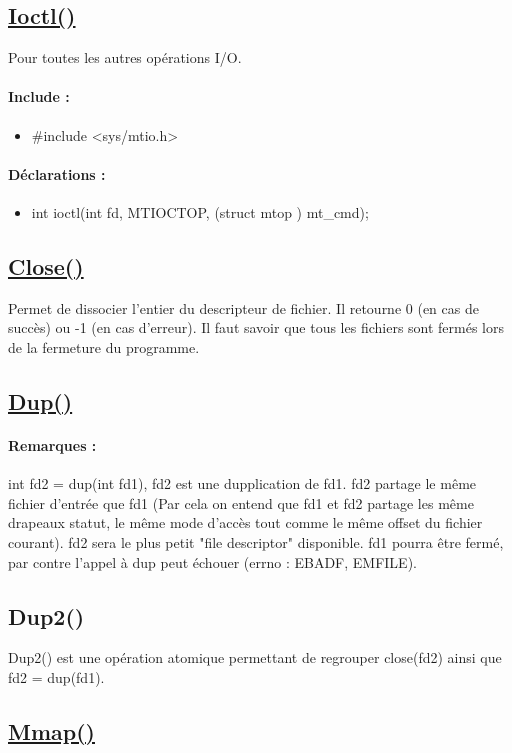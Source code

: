 \documentclass{article}[12pt]
\begin{document}
\subsection{\href{http://jp.barralis.com/linux-man/man2/ioctl.2.php}{Ioctl()}}
Pour toutes les autres opérations I/O.
\paragraph{Include : }
\begin{itemize}
	\item \#include <sys/mtio.h>
\end{itemize}
\paragraph{Déclarations : }
\begin{itemize}
	\item int ioctl(int fd, MTIOCTOP, (struct mtop \*) mt\_cmd);
\end{itemize}
\subsection{\href{http://jp.barralis.com/linux-man/man2/close.2.php}{Close()}}
Permet de dissocier l'entier du descripteur de fichier. Il retourne 0 (en cas de succès) ou -1 (en cas d'erreur). Il faut savoir que tous les fichiers sont fermés lors de la fermeture du programme.
\subsection{\href{http://jp.barralis.com/linux-man/man2/dup.2.php}{Dup()}}
\paragraph{Remarques : } int fd2 = dup(int fd1), fd2 est une dupplication de fd1. fd2 partage le même fichier d'entrée que fd1 (Par cela on entend que fd1 et fd2 partage les même drapeaux statut, le même mode d'accès tout comme le même offset du fichier courant). fd2 sera le plus petit "file descriptor" disponible. fd1 pourra être fermé, par contre l'appel à dup peut échouer (errno : EBADF, EMFILE).
\subsection{Dup2()}
Dup2() est une opération atomique permettant de regrouper close(fd2) ainsi que fd2 = dup(fd1).
\subsection{\href{http://jp.barralis.com/linux-man/man2/mmap.2.php}{Mmap()}}
\end{document}
